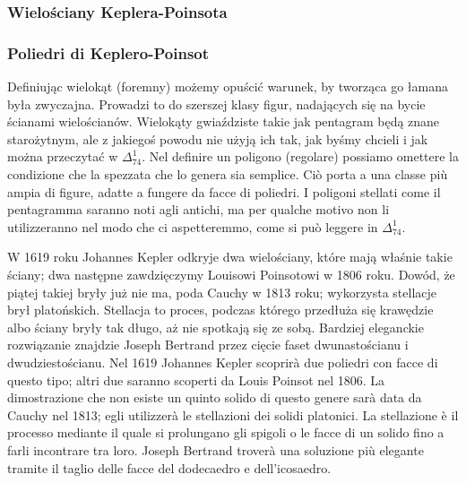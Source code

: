 
%

\subsubsection{Wielościany Keplera-Poinsota} %
\subsubsection{Poliedri di Keplero-Poinsot} %

Definiując wielokąt (foremny) możemy opuścić warunek, by tworząca go łamana była zwyczajna. %
Prowadzi to do szerszej klasy figur, nadających się na bycie ścianami wielościanów. %
Wielokąty gwiaździste takie jak pentagram będą znane starożytnym, ale z jakiegoś powodu nie użyją ich tak, jak byśmy chcieli i jak można przeczytać w $\Delta_{74}^1$. %
Nel definire un poligono (regolare) possiamo omettere la condizione che la spezzata che lo genera sia semplice. %
Ciò porta a una classe più ampia di figure, adatte a fungere da facce di poliedri. %
I poligoni stellati come il pentagramma saranno noti agli antichi, ma per qualche motivo non li utilizzeranno nel modo che ci aspetteremmo, come si può leggere in $\Delta_{74}^1$. %

W 1619 roku Johannes Kepler odkryje dwa wielościany, które mają właśnie takie ściany; dwa następne zawdzięczymy Louisowi Poinsotowi w 1806 roku. %
Dowód, że piątej takiej bryły już nie ma, poda Cauchy w 1813 roku; wykorzysta stellacje brył platońskich. %
Stellacja to proces, podczas którego przedłuża się krawędzie albo ściany bryły tak długo, aż nie spotkają się ze sobą. %
Bardziej eleganckie rozwiązanie znajdzie Joseph Bertrand przez cięcie faset dwunastościanu i dwudziestościanu. %
Nel 1619 Johannes Kepler scoprirà due poliedri con facce di questo tipo; altri due saranno scoperti da Louis Poinsot nel 1806. %
La dimostrazione che non esiste un quinto solido di questo genere sarà data da Cauchy nel 1813; egli utilizzerà le stellazioni dei solidi platonici. %
La stellazione è il processo mediante il quale si prolungano gli spigoli o le facce di un solido fino a farli incontrare tra loro. %
Joseph Bertrand troverà una soluzione più elegante tramite il taglio delle facce del dodecaedro e dell'icosaedro. %

